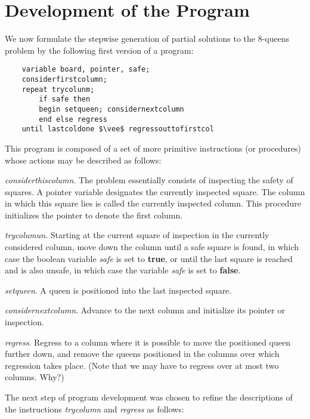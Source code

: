 \section{Development of the Program}

We now formulate the stepwise generation of partial solutions to the 8-queens
problem by the following first version of a program:

\begin{lstlisting}
    variable board, pointer, safe;
    considerfirstcolumn;
    repeat trycolunm;
        if safe then
        begin setqueen; considernextcolumn
        end else regress
    until lastcoldone $\vee$ regressouttofirstcol
\end{lstlisting}

This program is composed of a set of more primitive instructions (or
procedures) whose actions may be described as follows:

\vspace{5mm}
\begin{small}
\emph{considerthiscolumn}.  The problem essentially consists of inspecting the
safety of squares.  A pointer variable designates the currently inspected
square.  The column in which this square lies is called the currently inspected
column.  This procedure initializes the pointer to denote the first column.

\emph{trycolumun}.  Starting at the current square of inspection in the
currently considered column, move down the column until a safe square is found,
in which case the boolean variable \emph{safe} is set to \textbf{true}, or
until the last square is reached and is also unsafe, in which case the variable
\emph{safe} is set to \textbf{false}.

\emph{setqueen}.  A queen is positioned into the last inspected square.

\emph{considernextcolumn}.  Advance to the next column and initialize its
pointer or inspection.

\emph{regress}.  Regress to a column where it is possible to move the
positioned queen further down, and remove the queens positioned in the columns
over which regression takes place.  (Note that we may have to regress over at
most two columns. Why?)
\end{small}
\vspace{5mm}

The next step of program development was chosen to refine the descriptions of
the instructions \emph{trycolumn} and \emph{regress} as follows:

